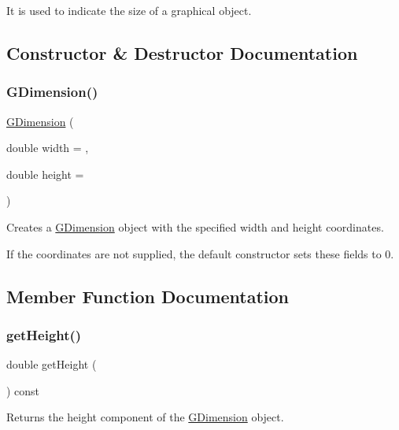 It is used to indicate the size of a graphical object. 

\subsection{Constructor \& Destructor Documentation}
\mbox{\label{classGDimension_a6b8171acdd56ca62c8bea0f73bd27ea7}} 
\subsubsection{\texorpdfstring{G\+Dimension()}{GDimension()}}
{\footnotesize\ttfamily \mbox{\hyperlink{classGDimension}{G\+Dimension}} (\begin{DoxyParamCaption}\item[{double}]{width = {},  }\item[{double}]{height = {} }\end{DoxyParamCaption})}



Creates a {\ttfamily \mbox{\hyperlink{classGDimension}{G\+Dimension}}} object with the specified {\ttfamily width} and {\ttfamily height} coordinates. 

If the coordinates are not supplied, the default constructor sets these fields to 0. 

\subsection{Member Function Documentation}
\mbox{\label{classGDimension_a1e7e353362434072875264cf95629f99}} 
\subsubsection{\texorpdfstring{get\+Height()}{getHeight()}}
{\footnotesize\ttfamily double get\+Height (\begin{DoxyParamCaption}{ }\end{DoxyParamCaption}) const}



Returns the height component of the {\ttfamily \mbox{\hyperlink{classGDimension}{G\+Dimension}}} object. 

